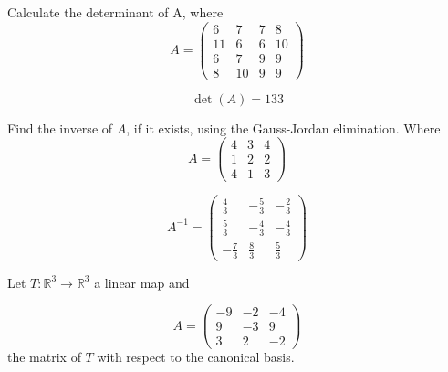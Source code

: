 \begin{questions}

\question Calculate the determinant of A, where
$$
A=\left(\begin{array}{rrrr}
6 & 7 & 7 & 8 \\
11 & 6 & 6 & 10 \\
6 & 7 & 9 & 9 \\
8 & 10 & 9 & 9
\end{array}\right)
$$

\begin{solution}
$$\det(A)=133$$
\end{solution}

\question Find the inverse of $A$, if it exists, using the Gauss-Jordan elimination. Where
$$
A=\left(\begin{array}{rrr}
4 & 3 & 4 \\
1 & 2 & 2 \\
4 & 1 & 3
\end{array}\right)
$$

\begin{solution}
$$A^{-1}=\left(\begin{array}{rrr}
\frac{4}{3} & -\frac{5}{3} & -\frac{2}{3} \\
\frac{5}{3} & -\frac{4}{3} & -\frac{4}{3} \\
-\frac{7}{3} & \frac{8}{3} & \frac{5}{3}
\end{array}\right)$$
\end{solution}

\question Let $T:\mathbb{R}^3\rightarrow\mathbb{R}^3$  a linear map and
 
$$
A=\left(\begin{array}{rrr}
-9 & -2 & -4 \\
9 & -3 & 9 \\
3 & 2 & -2
\end{array}\right)
$$
the matrix of $T$ with respect to the canonical basis.
\end{questions}
